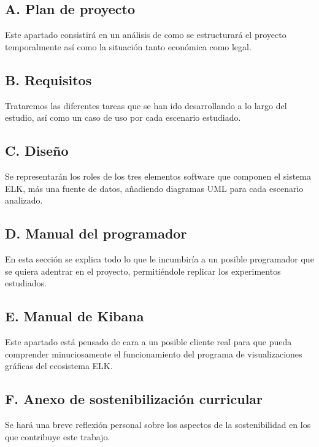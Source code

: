   \subsection{  A. Plan de proyecto}
  Este apartado consistirá en un análisis de como se estructurará el proyecto temporalmente así como la situación tanto económica como legal.
  \subsection{  B. Requisitos}
  Trataremos las diferentes tareas que se han ido desarrollando a lo largo del estudio, así como un caso de uso por cada escenario estudiado.
  \subsection{  C. Diseño}
  Se representarán los roles de los tres elementos software que componen el sistema ELK, más una fuente de datos, añadiendo diagramas UML para cada escenario analizado.
  \subsection{  D. Manual del programador}
  En esta sección se explica todo lo que le incumbiría a un posible programador que se quiera adentrar en el proyecto, permitiéndole replicar los experimentos estudiados.
  \subsection{  E. Manual de Kibana}
  Este apartado está pensado de cara a un posible cliente real para que pueda comprender minuciosamente el funcionamiento del programa de visualizaciones gráficas del ecosistema ELK.
  \subsection{  F. Anexo de sostenibilización curricular }
     Se hará una breve reflexión personal sobre los aspectos de la sostenibilidad en los que contribuye este trabajo.




